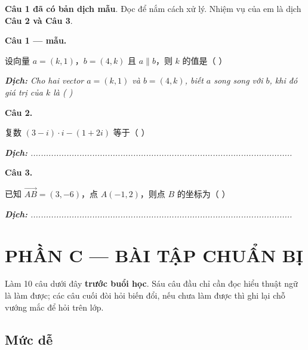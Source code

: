 \documentclass[11pt, a4paper]{article}
\begin{document}
\textbf{Câu 1 đã có bản dịch mẫu}. Đọc để nắm cách xử lý. Nhiệm vụ của em là dịch \textbf{Câu 2 và Câu 3}.

\textbf{Câu 1 — mẫu.}

设向量 $a=(k,1)$，$b=(4,k)$ 且 $a \parallel b$，则 $k$ 的值是（ ）

\noindent\emph{\textbf{Dịch:} Cho hai vector $a = (k, 1)$ và $b = (4, k)$, biết $a$ song song với $b$, khi đó giá trị của $k$ là ( )}

\textbf{Câu 2.}

复数 $(3-i)\cdot i-(1+2i)$ 等于（ ）

\noindent\emph{\textbf{Dịch:} ......................................................................................................}

\textbf{Câu 3.}

已知 $\overrightarrow{AB}=(3,-6)$，点 $A(-1,2)$，则点 $B$ 的坐标为（ ）

\noindent\emph{\textbf{Dịch:} ......................................................................................................}

\section{PHẦN C — BÀI TẬP CHUẨN BỊ}

Làm 10 câu dưới đây \textbf{trước buổi học}. Sáu câu đầu chỉ cần đọc hiểu thuật ngữ là làm được; các câu cuối đòi hỏi biến đổi, nếu chưa làm được thì ghi lại chỗ vướng mắc để hỏi trên lớp.

\subsection{Mức dễ}
\end{document}
